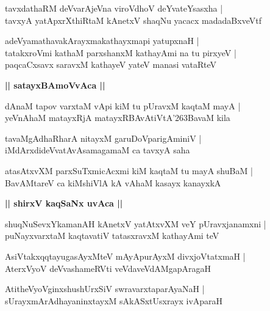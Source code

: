 \documentclass[twoside,12pt,openright]{book}
\def\S{\char'263}
\newcounter{shloka}[chapter]
\def\uvaca#1{\centerline{{\large\textbf{#1}}}}
\begin{document}
\begin{shloka}%
tavxdathaRM deVvarAjeVna viroVdhoV deYvateYsasxha |\\
tavxyA yatApxrXthiRtaM kAnetxV shaqNu yacacx madadaBxveVtf
\end{shloka}

\begin{shloka}%
adeVyamathavakArayxmakathayxmapi yatupxnaH |\\
tatakxroVmi kathaM parxshanxM kathayAmi na tu pirxyeV |\\
paqcaCxsavx saravxM kathayeV yateV manasi vataRteV 
\end{shloka}

\uvaca{|| satayxBAmoVvAca ||}

\begin{shloka}%
dAnaM tapov varxtaM vApi kiM tu pUravxM kaqtaM mayA |\\
yeVnAhaM matayxRjA matayxRBAvAtiVtA\S BavaM kila
\end{shloka}

\begin{shloka}%
tavaMgAdhaRharA nitayxM garuDoVparigAminiV |\\
iMdArxdideVvatAvAsamagamaM ca tavxyA saha 
\end{shloka}

\begin{shloka}%
atasAtxvXM parxSuTxmicAcxmi kiM kaqtaM tu mayA shuBaM |\\
BavAMtareV ca kiMshiVlA kA vAhaM kasayx kanayxkA 
\end{shloka}

\uvaca{|| shirxV kaqSaNx uvAca ||}

\begin{shloka}%
shuqNuSevxYkamanAH kAnetxV yatAtxvXM veY pUravxjanamxni |\\
puNayxvarxtaM kaqtavatiV tatasxravxM kathayAmi teV 
\end{shloka}

\begin{shloka}%
AsiVtakxqqtayugasAyxMteV mAyApurAyxM divxjoVtatxmaH |\\
AterxVyoV deVvashameRVti veVdaveVdAMgapAragaH 
\end{shloka}

\begin{shloka}%
AtitheVyoVginxshushUrxSiV swravarxtaparAyaNaH |\\
sUrayxmArAdhayaninxtayxM sAkASxtUsxrayx ivAparaH 
\end{shloka}
\end{document}
